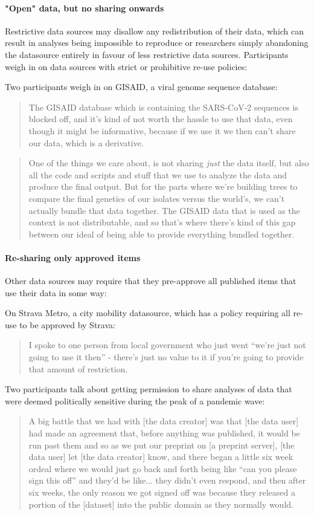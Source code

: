 \documentclass{CUP-JNL-DAP}%
\begin{document}
\paragraph{"Open" data, but no sharing onwards}

Restrictive data sources may disallow any redistribution of their data, which can result in analyses being impossible to reproduce or researchers simply abandoning the datasource entirely in favour of less restrictive data sources. Participants weigh in on data sources with strict or prohibitive re-use policies: 

Two participants weigh in on GISAID, a viral genome sequence database: 
\blockquote{The GISAID database which is containing the SARS-CoV-2 sequences is blocked off, and it's kind of not worth the hassle to use that data, even though it might be informative, because if we use it we then can't share our data, which is a derivative.}

\blockquote{One of the things we care about, is not sharing \textit{just} the data itself, but also all the code and scripts and stuff that we use to analyze the data and produce the final output. But for the parts where we're building trees to compare the final genetics of our isolates versus the world's, we can't actually bundle that data together. The GISAID data that is used as the context is not distributable, and so that's where there's kind of this gap between our ideal of being able to provide everything bundled together.}

\paragraph{Re-sharing only approved items}
Other data sources may require that they pre-approve all published items that use their data in some way:

On Strava Metro, a city mobility datasource, which has a policy requiring all re-use to be approved by Strava:

\blockquote {I spoke to one person from local government who just went \enquote{we're just not going to use it then} - there's just no value to it if you're going to provide that amount of restriction.}

Two participants talk about getting permission to share analyses of data that were deemed politically sensitive during the peak of a pandemic wave: 

\blockquote{A big battle that we had with [the data creator] was that [the data user] had made an agreement that, before anything was published, it would be run past them and so as we put our preprint on [a preprint server], [the data user] let [the data creator] know, and there began a little six week ordeal where we would just go back and forth being like \enquote{can you please sign this off} and they'd be like... they didn't even respond, and then after six weeks, the only reason we got signed off was because they released a portion of the [dataset] into the public domain as they normally would.}
\end{document}
